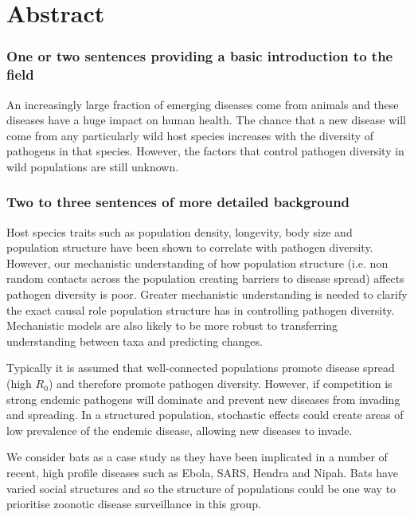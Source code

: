 
\clearpage
\section{Abstract}

\subsubsection{One or two sentences providing a basic introduction to the field}
An increasingly large fraction of emerging diseases come from animals and these diseases have a huge impact on human health.
The chance that a new disease will come from any particularly wild host species increases with the diversity of pathogens in that species.
However, the factors that control pathogen diversity in wild populations are still unknown.



\subsubsection{Two to three sentences of more detailed background}

Host species traits such as population density, longevity, body size and population structure have been shown to correlate with pathogen diversity.
However, our mechanistic understanding of how population structure (i.e. non random contacts across the population creating barriers to disease spread) affects pathogen diversity is poor.
Greater mechanistic understanding is needed to clarify the exact causal role population structure has in controlling pathogen diversity.
Mechanistic models are also likely to be more robust to transferring understanding between taxa and predicting changes. %

Typically it is assumed that well-connected populations promote disease spread (high $R_0$) and therefore promote pathogen diversity.
However, if competition is strong endemic pathogens will dominate and prevent new diseases from invading and spreading.
In a structured population, stochastic effects could create areas of low prevalence of the endemic disease, allowing new diseases to invade.

We consider bats as a case study as they have been implicated in a number of recent, high profile diseases such as Ebola, SARS, Hendra and Nipah.
Bats have varied social structures and so the structure of populations could be one way to prioritise zoonotic disease surveillance in this group.

